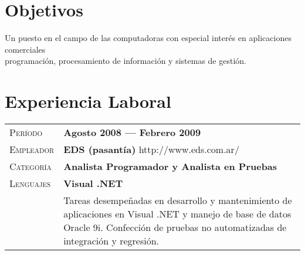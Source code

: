 \documentclass[a4paper, oneside, final]{scrartcl} %
\newcommand{\gray}{\rowcolor[gray]{.90}} %
\begin{document}
 
\begin{center} %
 
 
{\fontsize{36}{36}\selectfont\scshape{}} %
 
\vspace{1.5cm} %
 
 
\section{Objetivos}
 
Un puesto en el campo de las computadoras con especial interés en aplicaciones comerciales \\ programación, procesamiento de información y sistemas de gestión.
 
 
\section{Experiencia Laboral}
 
\begin{tabularx}{0.97\linewidth}{>{\raggedleft\scshape}p{2cm}X}
\gray Período   & \textbf{Agosto 2008 --- Febrero 2009}\\
\gray Empleador & \textbf{EDS (pasantía)} \hfill http://www.eds.com.ar/\\
\gray Categoría & \textbf{Analista Programador y Analista en Pruebas}\\
\gray Lenguajes & \textbf{Visual .NET}\\
       & Tareas desempeñadas en desarrollo y mantenimiento de aplicaciones en Visual .NET y manejo de base de datos Oracle 9i. Confección de pruebas no automatizadas de integración y regresión.
\end{tabularx}
 

\end{center}
\end{document}
